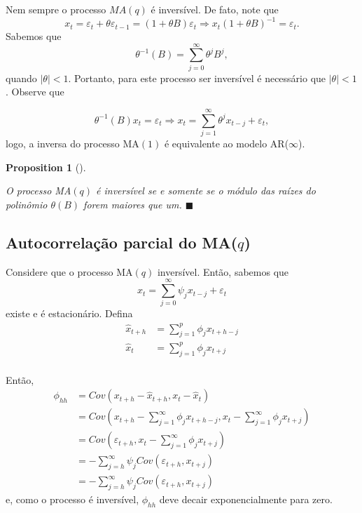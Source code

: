 \documentclass[
  letterpaper,
  DIV=11,
  numbers=noendperiod]{scrartcl}
\theoremstyle{plain}
\newtheorem{proposition}{Proposition}[chapter]
\theoremstyle{plain}
\theoremstyle{definition}
\theoremstyle{definition}
\theoremstyle{remark}
\begin{document}
Nem sempre o processo \(MA(q)\) é inversível. De fato, note que
\[x_t=\varepsilon_t +\theta\varepsilon_{t-1}=(1+\theta B)\varepsilon_t\Rightarrow x_t(1+\theta B)^{-1}=\varepsilon_t.\]
Sabemos que \[\theta^{-1}(B)=\sum_{j=0}^{\infty}\theta^j B^j,\] quando
\(|\theta|<1\). Portanto, para este processo ser inversível é necessário
que \(|\theta|<1\). Observe que

\[\theta^{-1}(B)x_t=\varepsilon_t\Rightarrow x_t=\sum_{j=1}^\infty \theta^j x_{t-j}+\varepsilon_t,\]
logo, a inversa do processo MA\((1)\) é equivalente ao modelo
AR(\(\infty\)).

\begin{proposition}[]\protect\hypertarget{prp-}{}\label{prp-}

O processo MA\((q)\) é inversível se e somente se o módulo das raízes do
polinômio \(\theta(B)\) forem maiores que um. \(\blacksquare\)

\end{proposition}

\hypertarget{autocorrelauxe7uxe3o-parcial-do-maq}{%
\subsection{\texorpdfstring{Autocorrelação parcial do
MA(\(q\))}{Autocorrelação parcial do MA(q)}}\label{autocorrelauxe7uxe3o-parcial-do-maq}}

Considere que o processo MA\((q)\) inversível. Então, sabemos que
\[x_t=\sum_{j=0}^\infty\psi_j x_{t-j}+\varepsilon_t \] existe e é
estacionário. Defina \[\begin{align}
\hat{x}_{t+h}&=\sum_{j=1}^p\phi_j x_{t+h-j}\\
\hat{x}_{t}&=\sum_{j=1}^p\phi_j x_{t+j}\\
\end{align}\]

Então,
\[\begin{align}\phi_{hh}&=Cov(x_{t+h}-\hat{x}_{t+h},x_t-\hat{x}_t)\\
&=Cov\left(x_{t+h}-\sum_{j=1}^\infty\phi_j x_{t+h-j},x_t- \sum_{j=1}^\infty\phi_j x_{t+j}\right)\\&=Cov\left(\varepsilon_{t+h},x_t- \sum_{j=1}^\infty\phi_j x_{t+j}\right)\\&=-\sum_{j=h}^\infty\psi_jCov(\varepsilon_{t+h},x_{t+j})\\&=-\sum_{j=h}^\infty\psi_jCov(\varepsilon_{t+h},x_{t+j})\end{align}\]
e, como o processo é inversível, \(\phi_{hh}\) deve decair
exponencialmente para zero.
\end{document}

